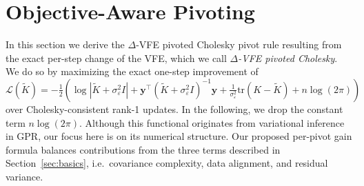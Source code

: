 \documentclass[onefignum,onetabnum]{siamart250211}
\newcommand{\tr}{\mathrm{tr}}
\begin{document}
\section{Objective-Aware Pivoting}
\label{sec:objectiveAware}

In this section we derive the $\Delta$-VFE pivoted Cholesky pivot rule resulting from the exact per-step change of the VFE, which we call \textit{$\Delta$-VFE pivoted Cholesky}. We do so by maximizing the exact one-step improvement of $\mathcal{L}(\widetilde{K}) = -\frac{1}{2}\left( \log|\widetilde{K}+\sigma_\varepsilon^2 I| + \bm{y}^\top (\widetilde{K}+\sigma_\varepsilon^2I )^{-1}\bm{y} + \frac{1}{\sigma_\varepsilon^2}\tr (K - \widetilde{K}) + n\log(2\pi) \right)$ over Cholesky-consistent rank-1 updates. In the following, we drop the constant term $n\log(2\pi)$. Although this functional originates from variational inference in GPR, our focus here is on its numerical structure. Our proposed per-pivot gain formula balances contributions from the three terms described in Section~\ref{sec:basics}, i.e.~covariance complexity, data alignment, and residual variance. 
\end{document}
